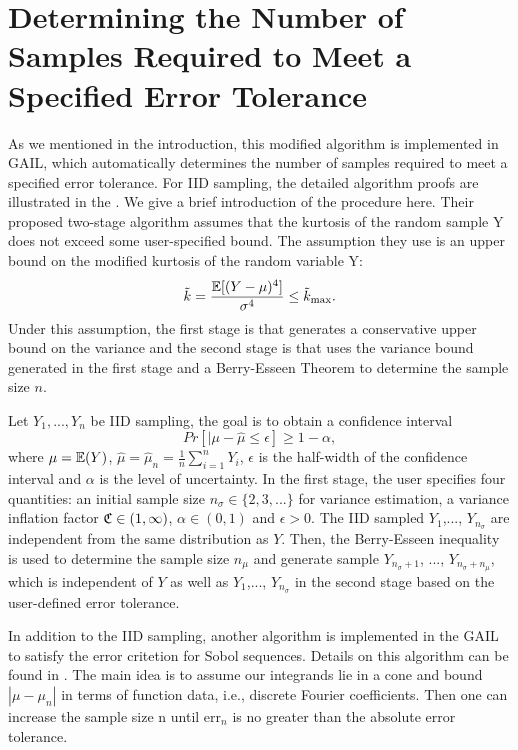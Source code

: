 \documentclass{ws-ijfe}
\begin{document}
\section{Determining the Number of Samples Required to Meet a Specified Error Tolerance}
As we mentioned in the introduction, this modified algorithm is implemented in GAIL, which automatically determines the number of samples required to meet a specified error tolerance. For IID sampling, the detailed algorithm proofs are illustrated in the \cite{HickernellandLan2013}. We give a brief introduction of the procedure here. Their proposed two-stage algorithm assumes that the kurtosis of the random sample Y does not exceed some user-specified bound. The assumption they use is an upper bound on the modified kurtosis of the random variable Y:
\begin{equation*}
  \tilde{k}=\frac{\mathbb{E}[(Y-\mu)^4]}{\sigma^4}\leq\tilde{k}_{\text{max}}.
\end{equation*}
Under this assumption, the first stage is that generates a conservative upper bound on the variance and the second stage is that uses the variance bound generated in the first stage and a Berry-Esseen Theorem to determine the sample size $n$.

Let $Y_1,...,Y_n$ be IID sampling, the goal is to obtain a confidence interval 
\begin{equation*}
  Pr[|\mu-\hat{\mu}\leq\epsilon]\geq1-\alpha,
\end{equation*}
where $\mu=\mathbb{E}(Y)$, $\hat{\mu}=\hat{\mu}_n=\frac{1}{n}\sum\limits_{i=1}^{n}Y_i$, $\epsilon$ is the half-width of the confidence interval and $\alpha$ is the level of uncertainty.
In the first stage, the user specifies four quantities: an initial sample size $n_{\sigma}\in\{2,3,...\}$ for variance estimation, a variance inflation factor $\frak{C}\in(1,\infty)$, $\alpha\in(0,1)$ and $\epsilon>0$. The IID sampled $Y_1$,..., $Y_{n_\sigma}$ are independent from the same distribution as $Y$. 
Then, the Berry-Esseen inequality is used to determine the sample size $n_\mu$ and generate sample $Y_{n_\sigma+1}$, ..., $Y_{n_\sigma+n_\mu}$, which is independent of $Y$ as well as $Y_1$,..., $Y_{n_\sigma}$ in the second stage based on the user-defined error tolerance.

In addition to the IID sampling, another algorithm is implemented in the GAIL to satisfy the error critetion for Sobol sequences. Details on this algorithm can be found in \cite{HickernellTonyandDa}. The main idea is to assume our integrands lie in a cone and bound $|\mu-\mu_n|$ in terms of function data, i.e., discrete Fourier coefficients. Then one can increase the sample size n until $\text{err}_n$ is no greater than the absolute error tolerance.
\end{document}
